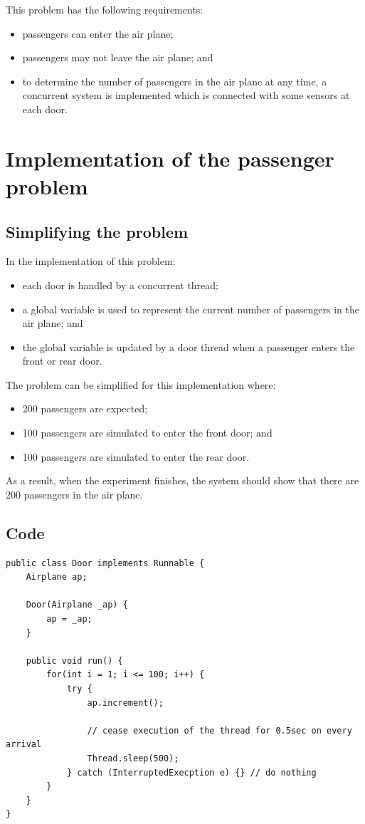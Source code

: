 \documentclass[a4paper]{systems-software}
\begin{document}
This problem has the following requirements:
\begin{itemize}
	\item passengers can enter the air plane;
	\item passengers may not leave the air plane; and
	\item to determine the number of passengers in the air plane at any time, a concurrent system is implemented which is connected with some sensors at each door.
\end{itemize}


\newpage

\section*{Implementation of the passenger problem}

\subsection*{Simplifying the problem}

In the implementation of this problem:
\begin{itemize}
	\item each door is handled by a concurrent thread;
	\item a global variable is used to represent the current number of passengers in the air plane; and
	\item the global variable is updated by a door thread when a passenger enters the front or rear door.
\end{itemize}

The problem can be simplified for this implementation where:
\begin{itemize}
	\item 200 passengers are expected;
	\item 100 passengers are simulated to enter the front door; and
	\item 100 passengers are simulated to enter the rear door.
\end{itemize}

As a result, when the experiment finishes, the system should show that there are 200 passengers in the air plane.


\subsection*{Code}

\begin{lstlisting}[title={Door class.}]
public class Door implements Runnable {
	Airplane ap;
	
	Door(Airplane _ap) {
		ap = _ap;
	}
	
	public void run() {
		for(int i = 1; i <= 100; i++) {
			try {
				ap.increment();
				
				// cease execution of the thread for 0.5sec on every arrival
				Thread.sleep(500);
			} catch (InterruptedExecption e) {} // do nothing
		}
	}
}
\end{lstlisting}
\end{document}
